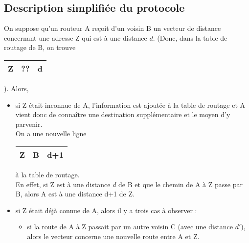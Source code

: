 \documentclass[11pt,a4paper,french,twoside]{PMCours}
\begin{document}
\subsection*{Description simplifiée du protocole}
On suppose qu'un routeur A reçoit d'un voisin B un vecteur de distance concernant une adresse Z qui est à une distance $d$. (Donc, dans la table de routage de B, on trouve \begin{tabular}{|l|l|l|}\hline Z&??&d \\ \hline \end{tabular} ). Alors, 
\begin{itemize}
\item si Z était inconnue de A, l'information est ajoutée à la table de routage et A vient donc de connaître une destination supplémentaire et le moyen d'y parvenir.\\
On a une nouvelle ligne \begin{tabular}{|l|l|l|}\hline Z&B&d+1 \\ \hline \end{tabular} à la table de routage.\\
{\color{red} En effet, si Z est à une distance $d$ de B et que le chemin de A à Z passe par B, alors A est à une distance d+1 de Z}.
\item si Z était déjà connue de A, alors il y a trois cas à observer :
\begin{itemize}
\item si la route de A à Z passait par un autre voisin C (avec une distance $d'$), alors le vecteur concerne une nouvelle route entre A et Z.



\end{itemize}
\end{itemize}
\end{document}

